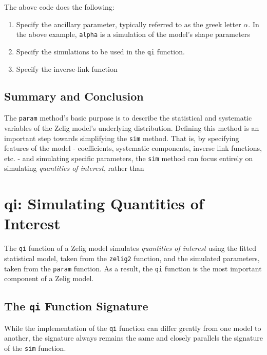 \documentclass{article}
\newcommand{\code}[1]{{\tt #1}}
\begin{document}
The above code does the following:

\begin{enumerate}

	\item Specify the ancillary parameter, typically referred to as the greek letter $\alpha$.
		In the above example, \code{alpha} is a simulation of the model's shape parameters
	
	\item Specify the simulations to be used in the \code{qi} function. 
	
	\item Specify the inverse-link function

\end{enumerate}


\subsection{Summary and Conclusion}

The \code{param} method's basic purpose is to describe the statistical and systematic variables of the Zelig model's underlying distribution. Defining this method is an important step towards simplifying the \code{sim} method. That is, by specifying features of the model - coefficients, systematic components, inverse link functions, etc. - and simulating specific parameters, the \code{sim} method can focus entirely on simulating \emph{quantities of interest}, rather than
	




\section{qi: Simulating Quantities of Interest}

The \code{qi} function of a Zelig model simulates \emph{quantities of interest}
using the fitted statistical model, taken from the \code{zelig2} function,
and the simulated parameters, taken from the \code{param} function. As a result,
the \code{qi} function is the most important component of a Zelig model.

\subsection{The \code{qi} Function Signature}

While the implementation of the \code{qi} function can differ greatly from one
model to another, the signature always remains the same and closely parallels the 
signature of the \code{sim} function.
\end{document}
